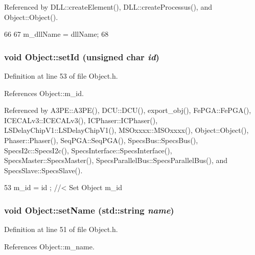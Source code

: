 Referenced by DLL::createElement(), DLL::createProcessus(), and Object::Object().


\begin{DoxyCode}
66                                       {
67     m_dllName = dllName;
68   }
\end{DoxyCode}
\hypertarget{classObject_a398fe08cba594a0ce6891d59fe4f159f}{
\subsubsection[{setId}]{\setlength{\rightskip}{0pt plus 5cm}void Object::setId (unsigned char {\em id})}}
\label{classObject_a398fe08cba594a0ce6891d59fe4f159f}


Definition at line 53 of file Object.h.

References Object::m\_\-id.

Referenced by A3PE::A3PE(), DCU::DCU(), export\_\-obj(), FePGA::FePGA(), ICECALv3::ICECALv3(), ICPhaser::ICPhaser(), LSDelayChipV1::LSDelayChipV1(), MSOxxxx::MSOxxxx(), Object::Object(), Phaser::Phaser(), SeqPGA::SeqPGA(), SpecsBus::SpecsBus(), SpecsI2c::SpecsI2c(), SpecsInterface::SpecsInterface(), SpecsMaster::SpecsMaster(), SpecsParallelBus::SpecsParallelBus(), and SpecsSlave::SpecsSlave().


\begin{DoxyCode}
53 { m_id    = id    ; } //< Set Object m_id
\end{DoxyCode}
\hypertarget{classObject_ae30fea75683c2d149b6b6d17c09ecd0c}{
\subsubsection[{setName}]{\setlength{\rightskip}{0pt plus 5cm}void Object::setName (std::string {\em name})}}
\label{classObject_ae30fea75683c2d149b6b6d17c09ecd0c}


Definition at line 51 of file Object.h.

References Object::m\_\-name.

